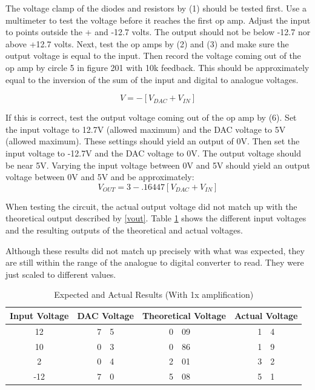 The voltage clamp of the diodes and resistors by (1) should be tested first. 
Use a multimeter to test the voltage before it reaches the first op amp. Adjust
 the input to points outside the + and -12.7 volts.  The output should not be 
below -12.7 nor above +12.7 volts.  Next, test the op amps by (2) and (3) and 
make sure the output voltage is equal to the input. Then record the voltage 
coming out of the op amp by circle 5 in figure 201 with 10k feedback. This 
should be approximately equal to the inversion of the sum of the input and 
digital to analogue voltages\cite{bk:olia}.  

\begin{equation} V = -[V_{DAC} + V_{IN}]\end{equation}

If this is correct, test the output voltage coming out of the op amp by
 (6). Set the input voltage to 12.7V (allowed maximum) and the DAC 
voltage to 5V (allowed maximum). These settings should yield an output of 0V. 
Then set the input voltage to -12.7V and the DAC voltage to 0V. The output 
voltage should be near 5V. Varying the input voltage between 0V and 5V should 
yield an output voltage between 0V and 5V and be approximately:
\begin{equation}\label{vout}V_{OUT} = 3 - .16447[V_{DAC} + V_{IN}]\end{equation}

When testing the circuit, the actual output voltage did not match up with the 
theoretical output described by \eqref{vout}. Table \ref{tab:analog input data}
 shows the different input voltages and the resulting outputs of the
 theoretical and actual voltages.

Although these results did not match up precisely with what was expected, they 
are still within the range of the analogue to digital converter to read. They 
were just scaled to different values.
\begin{table}[hbp]
\caption[Test Results]{Expected and Actual Results (With 1x amplification)}
\begin{center}
\begin{tabular}{c| r @{.} l r @{.} l r @{.} l}  
	Input Voltage & \multicolumn{2}{r}{DAC Voltage} &
	\multicolumn{2}{r}{Theoretical Voltage} &
	\multicolumn{2}{r}{Actual Voltage} \\ \hline
	12 & 7 & 5 & 0 & 09 & 1 & 4 \\ \hline
	10 & 0 & 3 & 0 & 86 & 1 & 9 \\ \hline
	2  & 0 & 4 & 2 & 01 & 3 & 2 \\ \hline
	-12 & 7 & 0 & 5 & 08 &5 & 1 \\
\end{tabular}
\end{center}
\label{tab:analog input data}
\end{table}
